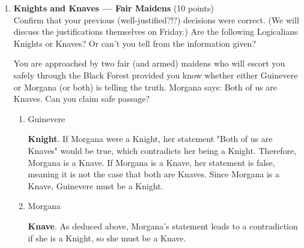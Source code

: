 \begin{enumerate}
  \item \textbf{Knights and Knaves --- Fair Maidens} (10 points)\\
  Confirm that your previous (well-justified?!?) decisions were correct. (We will discuss the justifications themselves on Friday.) Are the following Logicalians Knights or Knaves? Or can't you tell from the information given?

  You are approached by two fair (and armed) maidens who will escort you safely through the Black Forest provided you know whether either Guinevere or Morgana (or both) is telling the truth. Morgana says: Both of us are Knaves. Can you claim safe passage?
  \begin{enumerate}[label=\arabic*.]
    \item Guinevere\\
    \begin{subanswer}
      \textbf{Knight}. If Morgana were a Knight, her statement "Both of us are Knaves" would be true, which contradicts her being a Knight. Therefore, Morgana is a Knave. If Morgana is a Knave, her statement is false, meaning it is not the case that both are Knaves. Since Morgana is a Knave, Guinevere must be a Knight.
    \end{subanswer}
    \item Morgana\\
    \begin{subanswer}
      \textbf{Knave}. As deduced above, Morgana's statement leads to a contradiction if she is a Knight, so she must be a Knave.
    \end{subanswer}
  \end{enumerate}


\end{enumerate}
